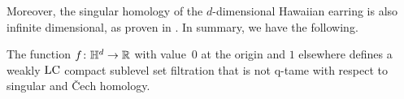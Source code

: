 %
%
%
%
%
Moreover, the singular homology of the $d$-dimensional Hawaiian earring is also infinite dimensional, as proven in \cite{Barratt.1962}.
In summary, we have the following.

\begin{cor} \label{c:counterexample}
	The function $f \colon \mathbb{H}^d \to \mathbb{R}$ with value~$0$ at the origin and $1$ elsewhere defines a weakly $\mathrm{LC}$ compact sublevel set filtration that is not q-tame with respect to singular and \v{C}ech homology.
\end{cor}

